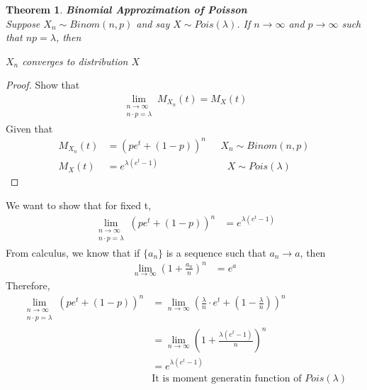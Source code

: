 \documentclass[11pt,oneside]{book}
\theoremstyle{break}
\theoremstyle{break}
\newtheorem{thm}{Theorem}[section]
\begin{document}
\begin{thm}\textbf{Binomial Approximation of Poisson}\\
Suppose $X_n\sim Binom(n,p)$ and say $X\sim Pois(\lambda )$. If $n\to \infty$ and $p\to \infty$ such that $np=\lambda$, then \begin{center}
$X_n$ converges to distribution $X$
\end{center}
\end{thm}
\begin{proof}
Show that \begin{align*}
\lim_{\substack{n\to \infty \\ n\cdot p=\lambda}}M_{X_n}(t)=M_X(t)
\end{align*}
Given that \begin{align*}
M_{X_n}(t)&=\left(pe^t+(1-p) \right)^n\text{ }&X_n\sim Binom(n,p)\\
M_X(t)&=e^{\lambda(e^t-1)}&\text{ }X\sim Pois(\lambda)
\end{align*}
\end{proof}
We want to show that for fixed t, \begin{align*}
\lim_{\substack{n\to \infty\\ n\cdot p =\lambda}}\left( pe^t+(1-p)\right)^n&=e^{\lambda(e^t-1)}
\end{align*}
From calculus, we know that if $\{a_n\}$ is a sequence such that $a_n\to a$, then \begin{align*}
\lim_{n\to \infty}\left( 1+\frac{a_n}{n}\right)^n&=e^a
\end{align*}
Therefore, \begin{align*}
\lim_{\substack{n\to \infty\\ n\cdot p =\lambda}}\left( pe^t+(1-p)\right)^n&=\lim_{n\to \infty}\left(\frac{\lambda}{n}\cdot e^t+\left( 1-\frac{\lambda}{n}\right) \right)^n\\
&=\lim_{n\to \infty}\left(1+\frac{\lambda\left(e^t-1 \right)}{n} \right)^n\\
&=e^{\lambda (e^t-1)}\\
&\text{It is moment generatin function of }Pois(\lambda)
\end{align*}
\end{document}
